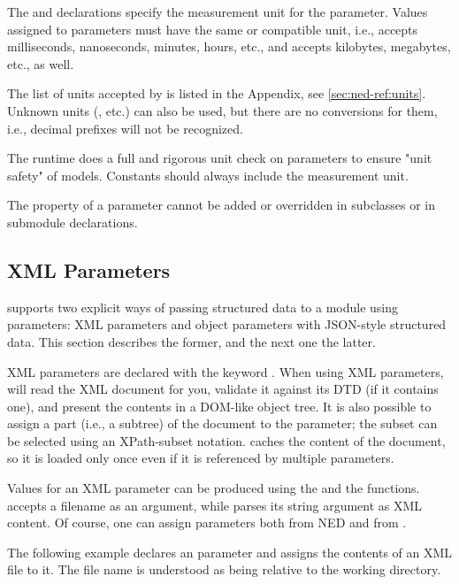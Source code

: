 The  and  declarations specify the measurement
unit for the parameter. Values assigned to parameters must have the same or
compatible unit, i.e.,  accepts milliseconds, nanoseconds,
minutes, hours, etc., and  accepts kilobytes, megabytes, etc.,
as well.

\begin{note}
    The list of units accepted by {\opp} is listed in the Appendix, see
    \ref{sec:ned-ref:units}. Unknown units (, etc.) can also be
    used, but there are no conversions for them, i.e., decimal prefixes will not
    be recognized.
\end{note}

The {\opp} runtime does a full and rigorous unit check on parameters to ensure
"unit safety" of models. Constants should always include the measurement unit.

The  property of a parameter cannot be added or overridden in
subclasses or in submodule declarations.

\subsection{XML Parameters}
\label{sec:ned-lang:xml-parameters}

{\opp} supports two explicit ways of passing structured data to a module using
parameters: XML parameters and object parameters with JSON-style structured
data. This section describes the former, and the next one the latter.

XML parameters are declared with the keyword . When using XML
parameters, {\opp} will read the XML document for you, validate it against its
DTD (if it contains one), and present the contents in a DOM-like object tree. It
is also possible to assign a part (i.e., a subtree) of the document to the
parameter; the subset can be selected using an XPath-subset notation. {\opp}
caches the content of the document, so it is loaded only once even if it is
referenced by multiple parameters.

Values for an XML parameter can be produced using the  and
the  functions.  accepts a filename as an
argument, while  parses its string argument as XML content. Of
course, one can assign  parameters both from NED and from
.

The following example declares an  parameter and assigns the
contents of an XML file to it. The file name is understood as being relative to
the working directory.

